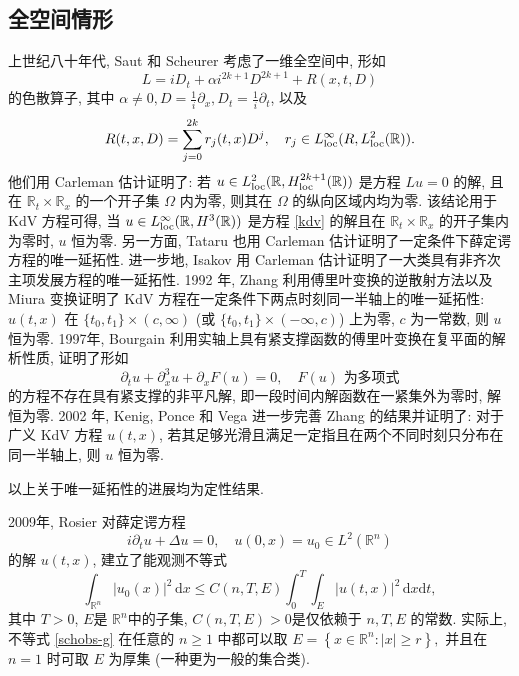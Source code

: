 \documentclass[master]{cugthesis}
\newcommand\R{\ensuremath{\mathbb{R}}}
\renewcommand\d{\ensuremath{\,\mathrm{d}}}
\begin{document}
\subsection{全空间情形}    
    上世纪八十年代, Saut 和 Scheurer \cite{saut1980theoreme,Saut1987UniqueCF} 考虑了一维全空间中, 形如
    \begin{equation*}
        L=iD_t +\alpha i^{2k+1}D^{2k+1}+R(x,t,D)
    \end{equation*}
    的色散算子, 其中 $\alpha\neq 0, D=\frac{1}{i}\partial_x, D_t =\frac{1}{i}\partial_t$, 以及
    \begin{equation*}
        R(t,x,D)=\sum_{j=0}^{2k}r_j(t,x)D^j,\quad r_j\in L_{\rm{loc}}^\infty(R,L^2_{\rm{loc}}(\R)).
    \end{equation*}
    他们用 Carleman 估计证明了: 若 $u\in L^2_{\rm{loc}}(\R,H_{\rm{loc}}^{2k+1}(\R))$ 是方程 $Lu=0$ 的解, 且在 $\R_t\times\R_x $ 的一个开子集 $\Omega$ 内为零, 则其在 $\Omega$ 的纵向区域内均为零. 该结论用于 KdV 方程可得, 当 $u\in L_{\rm{loc}}^\infty (\R, H^3(\R))$ 是方程 \eqref{kdv} 的解且在 $\R_t\times \R_x$ 的开子集内为零时, $u$ 恒为零. 另一方面, Tataru \cite{tataru1995carleman} 也用 Carleman 估计证明了一定条件下薛定谔方程的唯一延拓性. 进一步地, Isakov \cite{isakov1993carleman} 用 Carleman 估计证明了一大类具有非齐次主项发展方程的唯一延拓性. 
    1992 年, Zhang \cite{Zhang1992UniqueCF} 利用傅里叶变换的逆散射方法以及 Miura 变换证明了 KdV 方程在一定条件下两点时刻同一半轴上的唯一延拓性: $u(t,x)$ 在 $\lbrace t_0,t_1\rbrace\times (c,\infty)$ (或 $\lbrace t_0,t_1\rbrace \times (-\infty,c)$) 上为零, $c$ 为一常数, 则 $u$ 恒为零. 1997年, Bourgain  \cite{bourgain1997compactness} 利用实轴上具有紧支撑函数的傅里叶变换在复平面的解析性质, 证明了形如 
    \begin{equation*}
        \partial_t u+ \partial_x^3u+\partial_x F(u) = 0, \quad F(u) \text{ 为多项式}
    \end{equation*}
  的方程不存在具有紧支撑的非平凡解, 即一段时间内解函数在一紧集外为零时, 解恒为零. 2002 年, Kenig, Ponce 和 Vega \cite{kenig2002support} 进一步完善 Zhang \cite{Zhang1992UniqueCF} 的结果并证明了: 对于广义 KdV 方程 $u(t,x)$, 若其足够光滑且满足一定指且在两个不同时刻只分布在同一半轴上, 则 $u$ 恒为零.
  
  以上关于唯一延拓性的进展均为定性结果.   
    
    2009年, Rosier \cite{Rosier2009ExactBC} 对薛定谔方程
    \begin{equation}
        i\partial_t u +\Delta u =0,\quad u(0,x)=u_0\in L^2(\R^n)\label{sch}
    \end{equation}
    的解 $u(t,x)$, 建立了能观测不等式
    \begin{equation}
        \int_{\R^n}|u_0(x)|^2\d x\le C(n,T,E)\int_0^T\int_E|u(t,x)|^2\d x\mathrm{d}t,\label{schobs-g}
    \end{equation}
    其中 $T>0$, $E$是 $\R^n$中的子集, $C(n,T,E)>0$是仅依赖于 $n,T,E$ 的常数. 实际上, 不等式 \eqref{schobs-g} 在任意的 $n\ge 1$ 中都可以取 $E=\left\lbrace x\in \R^n: |x|\ge r\right\rbrace, $ 并且在 $n=1$ 时可取 $E$ 为厚集\cite{Huang2020ObservableSP} (一种更为一般的集合类). 
    
\end{document}
